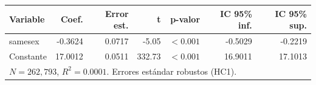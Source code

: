
\begin{tabular}{lrrrrrr}
\toprule
Variable & Coef. & Error est. & t & p-valor & IC 95\% inf. & IC 95\% sup.\\
\midrule
samesex & -0.3624 & 0.0717 & -5.05 & $<0.001$ & -0.5029 & -0.2219\\
Constante & 17.0012 & 0.0511 & 332.73 & $<0.001$ & 16.9011 & 17.1013\\
\midrule
\multicolumn{7}{l}{$N=262{,}793$, $R^2=0.0001$. Errores estándar robustos (HC1).}\\
\bottomrule
\end{tabular}
